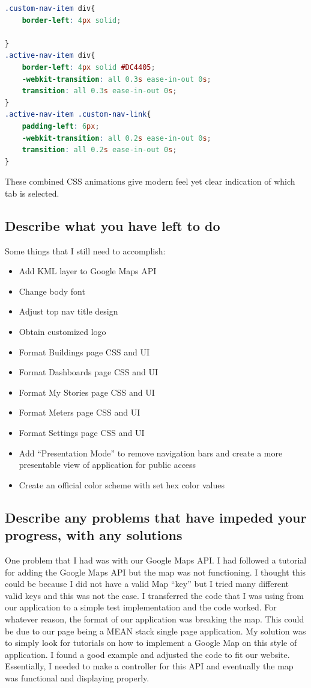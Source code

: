 \documentclass[letterpaper,10pt,serif,draftclsnofoot,onecolumn,compsoc,titlepage]{IEEEtran}
\begin{document}
\begin{lstlisting}[caption={CSS Implementation} language=CSS]
.custom-nav-item div{
    border-left: 4px solid;
	
}
.active-nav-item div{
    border-left: 4px solid #DC4405;
    -webkit-transition: all 0.3s ease-in-out 0s;
    transition: all 0.3s ease-in-out 0s;
}
.active-nav-item .custom-nav-link{
    padding-left: 6px;
	-webkit-transition: all 0.2s ease-in-out 0s;
    transition: all 0.2s ease-in-out 0s;
}
\end{lstlisting}
	
	These combined CSS animations give modern feel yet clear indication of which tab is selected.
	
\subsection{Describe what you have left to do}
Some things that I still need to accomplish:
\begin{itemize}
  \item Add KML layer to Google Maps API
  \item Change body font
  \item Adjust top nav title design
  \item Obtain customized logo
  \item Format Buildings page CSS and UI
  \item Format Dashboards page CSS and UI
  \item Format My Stories page CSS and UI
  \item Format Meters page CSS and UI
  \item Format Settings page CSS and UI
  \item Add ``Presentation Mode'' to remove navigation bars and create a more presentable view of application for public access
  \item Create an official color scheme with set hex color values
\end{itemize}
\subsection{Describe any problems that have impeded your progress, with any solutions}
One problem that I had was with our Google Maps API. I had followed a tutorial for adding the Google Maps API but the map was not functioning. I thought this could 
be because I did not have a valid Map ``key'' but I tried many different valid keys and this was not the case. I transferred the code that I was using from our application
to a simple test implementation and the code worked. For whatever reason, the format of our application was breaking the map. This could be due to our page being a 
MEAN stack single page application. My solution was to simply look for tutorials on how to implement a Google Map on this style of application. I found a good example and 
adjusted the code to fit our website. Essentially, I needed to make a controller for this API and eventually the map was functional and displaying properly. \\
\end{document}
